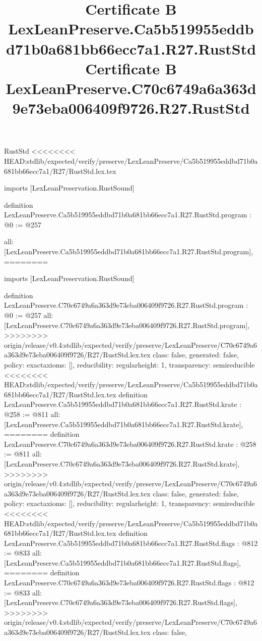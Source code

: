\begin{lexlean}{RustStd}
<<<<<<<< HEAD:stdlib/expected/verify/preserve/LexLeanPreserve/Ca5b519955eddbd71b0a681bb66ecc7a1/R27/RustStd.lex.tex
\title{Certificate B LexLeanPreserve.Ca5b519955eddbd71b0a681bb66ecc7a1.R27.RustStd}
\begin{coremodule}
imports [LexLeanPreservation.RustSound]

definition LexLeanPreserve.Ca5b519955eddbd71b0a681bb66ecc7a1.R27.RustStd.program : @0 := @257 {
  all: [LexLeanPreserve.Ca5b519955eddbd71b0a681bb66ecc7a1.R27.RustStd.program],
========
\title{Certificate B LexLeanPreserve.C70c6749a6a363d9e73eba006409f9726.R27.RustStd}
\begin{coremodule}
imports [LexLeanPreservation.RustSound]

definition LexLeanPreserve.C70c6749a6a363d9e73eba006409f9726.R27.RustStd.program : @0 := @257 {
  all: [LexLeanPreserve.C70c6749a6a363d9e73eba006409f9726.R27.RustStd.program],
>>>>>>>> origin/release/v0.4:stdlib/expected/verify/preserve/LexLeanPreserve/C70c6749a6a363d9e73eba006409f9726/R27/RustStd.lex.tex
  class: false,
  generated: false,
  policy: exact{axioms: []},
  reducibility: regular{height: 1},
  transparency: semireducible
}
<<<<<<<< HEAD:stdlib/expected/verify/preserve/LexLeanPreserve/Ca5b519955eddbd71b0a681bb66ecc7a1/R27/RustStd.lex.tex
definition LexLeanPreserve.Ca5b519955eddbd71b0a681bb66ecc7a1.R27.RustStd.krate : @258 := @811 {
  all: [LexLeanPreserve.Ca5b519955eddbd71b0a681bb66ecc7a1.R27.RustStd.krate],
========
definition LexLeanPreserve.C70c6749a6a363d9e73eba006409f9726.R27.RustStd.krate : @258 := @811 {
  all: [LexLeanPreserve.C70c6749a6a363d9e73eba006409f9726.R27.RustStd.krate],
>>>>>>>> origin/release/v0.4:stdlib/expected/verify/preserve/LexLeanPreserve/C70c6749a6a363d9e73eba006409f9726/R27/RustStd.lex.tex
  class: false,
  generated: false,
  policy: exact{axioms: []},
  reducibility: regular{height: 1},
  transparency: semireducible
}
<<<<<<<< HEAD:stdlib/expected/verify/preserve/LexLeanPreserve/Ca5b519955eddbd71b0a681bb66ecc7a1/R27/RustStd.lex.tex
definition LexLeanPreserve.Ca5b519955eddbd71b0a681bb66ecc7a1.R27.RustStd.flags : @812 := @833 {
  all: [LexLeanPreserve.Ca5b519955eddbd71b0a681bb66ecc7a1.R27.RustStd.flags],
========
definition LexLeanPreserve.C70c6749a6a363d9e73eba006409f9726.R27.RustStd.flags : @812 := @833 {
  all: [LexLeanPreserve.C70c6749a6a363d9e73eba006409f9726.R27.RustStd.flags],
>>>>>>>> origin/release/v0.4:stdlib/expected/verify/preserve/LexLeanPreserve/C70c6749a6a363d9e73eba006409f9726/R27/RustStd.lex.tex
  class: false,
}}}
\end{coremodule}}
\end{coremodule}
\end{lexlean}

